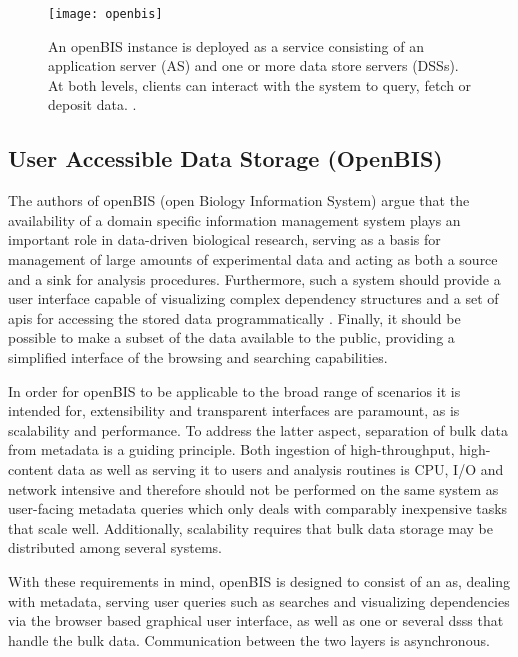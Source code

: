 \begin{figure}
  \centering
  \texttt{[image: openbis]}
  \caption[Overview of the openBIS architecture and a more in-depth look at the data storage implementation.]{An openBIS instance is deployed as a service consisting of an application server (AS) and one or more data store servers (DSSs). At both levels, clients can interact with the system to query, fetch or deposit data. \citep{Bauch2011}.}
  \label{fig:openbis}
\end{figure}

\subsection{User Accessible Data Storage (OpenBIS)}
The authors of openBIS (open Biology Information System) argue that the availability of a domain specific information management system plays an important role in data-driven biological research, serving as a basis for management of large amounts of experimental data and acting as both a source and a sink for analysis procedures. Furthermore, such a system should provide a user interface capable of visualizing complex dependency structures and a set of \glspl{api} for accessing the stored data programmatically \citep{Bauch2011}. Finally, it should be possible to make a subset of the data available to the public, providing a simplified interface of the browsing and searching capabilities.

In order for openBIS to be applicable to the broad range of scenarios it is intended for, extensibility and transparent interfaces are paramount, as is scalability and performance. To address the latter aspect, separation of bulk data from metadata is a guiding principle. Both ingestion of high-throughput, high-content data as well as serving it to users and analysis routines is CPU, I/O and network intensive and therefore should not be performed on the same system as user-facing metadata queries which only deals with comparably inexpensive tasks that scale well. Additionally, scalability requires that bulk data storage may be distributed among several systems.

With these requirements in mind, openBIS is designed to consist of an \gls{as}, dealing with metadata, serving user queries such as searches and visualizing dependencies via the browser based graphical user interface, as well as one or several \glspl{dss} that handle the bulk data. Communication between the two layers is asynchronous.


